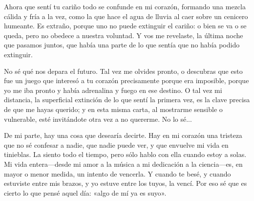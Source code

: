 \documentclass[a4paper, 12pt]{article}
\begin{document}
Ahora que sentí tu cariño todo se confunde en mi corazón, formando una mezcla
cálida y fría a la vez, como la que hace el agua de lluvia al caer sobre un
cenicero humeante. Es extraño, porque uno no puede extinguir el cariño: o bien
se va o se queda, pero no obedece a nuestra voluntad. Y vos me revelaste, la
última noche que pasamos juntos, que había una parte de lo que sentía que no
había podido extinguir. 

No sé qué nos depara el futuro. Tal vez me olvides pronto, o descubras que esto
fue un juego que interesó a tu corazón precisamente porque era imposible, porque
yo me iba pronto y había adrenalina y fuego en ese destino. O tal vez mi
distancia, la superficial extinción de lo que sentí la primera vez, es la clave
precisa de que me hayas querido; y en esta misma carta, al mostrarme sensible o
vulnerable,
esté invitándote otra vez a no quererme. No lo sé... 

De mi parte, hay una cosa que desearía decirte. Hay en mi corazón una tristeza
que no sé confesar a nadie, que nadie puede ver, y que envuelve mi vida en
tinieblas. La siento todo el tiempo, pero sólo hablo con ella cuando estoy a
solas. Mi vida entera---desde mi amor a la música a mi dedicación a la
ciencia---es, en mayor o menor medida, un intento de vencerla. Y cuando te besé,
y cuando estuviste entre mis brazos, y yo estuve entre los tuyos, la vencí. Por
eso sé que es cierto lo que pensé aquel día: «algo de mí ya es suyo».
\end{document}
